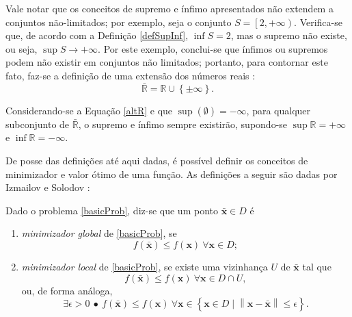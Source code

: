 Vale notar que os conceitos de supremo e \'{i}nfimo apresentados n\~{a}o extendem a conjuntos n\~{a}o-limitados; por exemplo, seja o conjunto $S = \left[ 2,+\infty \right)$. Verifica-se que, de acordo com a Defini\c{c}\~{a}o \ref{defSupInf}, $\inf S = 2$, mas o supremo n\~{a}o existe, ou seja, $\sup S \to +\infty$. Por este exemplo, conclui-se que \'{i}nfimos ou supremos podem n\~{a}o existir em conjuntos n\~{a}o limitados; portanto, para contornar este fato, faz-se a defini\c{c}\~{a}o de uma extens\~{a}o dos n\'{u}meros reais \cite{yang}: 
\begin{equation}
\label{altR}
\bar{\mathbb{R}} = \mathbb{R} \cup \left\lbrace \pm \infty \right\rbrace.
\end{equation}

Considerando-se a Equa\c{c}\~{a}o \eqref{altR} e que $\sup(\emptyset) = -\infty$, para qualquer subconjunto de $\bar{\mathbb{R}}$, o supremo e \'{i}nfimo sempre existir\~{a}o, supondo-se $\sup \mathbb{R} = +\infty$ e $\inf \mathbb{R} = -\infty$.

De posse das defini\c{c}\~{o}es at\'{e} aqui dadas, \'{e} poss\'{i}vel definir os conceitos de minimizador e valor \'{o}timo de uma fun\c{c}\~{a}o. As defini\c{c}\~{o}es a seguir s\~{a}o dadas por Izmailov e Solodov \cite{izmailov}:

\begin{definition} 
Dado o problema \eqref{basicProb}, diz-se que um ponto $\bar{\mathbf{x}} \in D$ \'{e}
\begin{enumerate}[label=(\alph*)]
\item \textit{minimizador global} de \eqref{basicProb}, se
\begin{equation}
\label{globalMin}
f(\bar{\mathbf{x}}) \le f(\mathbf{x}) ~ \forall \mathbf{x} \in D;
\end{equation}
\item \textit{minimizador local} de \eqref{basicProb}, se existe uma vizinhan\c{c}a $U$ de $\bar{\mathbf{x}}$ tal que
\begin{equation}
\label{localMin}
f(\bar{\mathbf{x}}) \le f(\mathbf{x}) ~ \forall \mathbf{x} \in D \cap U,
\end{equation} ou, de forma an\'{a}loga,
\begin{equation}
\exists \epsilon > 0 ~ \bullet ~ f(\bar{\mathbf{x}}) \le f(\mathbf{x}) ~ \forall \mathbf{x} \in \left\lbrace \mathbf{x} \in D \mid \left\|\mathbf{x} - \bar{\mathbf{x}} \right\| \le \epsilon \right\rbrace.
\end{equation}
\end{enumerate}
\end{definition} 

